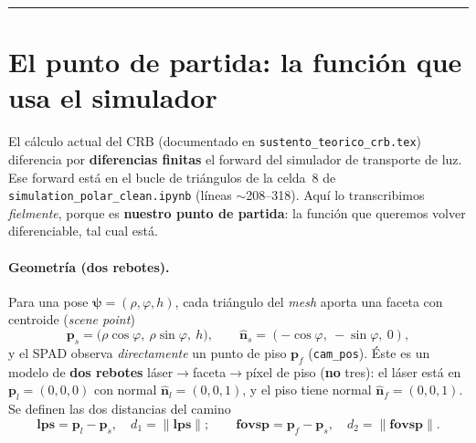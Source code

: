 \documentclass[11pt,a4paper]{article}
\theoremstyle{plain}
\theoremstyle{definition}
\newcommand{\vect}[1]{\boldsymbol{#1}}
\newcommand{\norm}[1]{\left\lVert #1 \right\rVert}
\begin{document}
\begin{abstract}
la superposici\'on anal\'itico-vs-FD a \emph{magnitud real} coincide dentro de
$\sim\!10\%$ en \textbf{ambos} ejes ($\sigma_\rho$ \emph{y} $\sigma_\varphi$),
gracias a densificar la faceta y a ligar los anchos de suavizado a la
discretizaci\'on ($\kappa=1/$p\'ixel, $\tau=\Delta t/\sqrt{12}$). Las derivadas se
obtienen \textbf{simb\'olicamente} con \texttt{sympy} (an\'alogo al Mathematica del
\emph{writeup}) y se validan contra diferencias finitas del mismo forward suave,
con error m\'aximo relativo $\sim\!5.5\times10^{-9}$. C\'odigo:
\texttt{crb\_analytic\_forward.py}; validaci\'on:
\texttt{validate\_analytic\_forward.py}. Importante: el CRB es funci\'on
\emph{solo del modelo} (no consume datos), y este forward anal\'itico es un
modelo \emph{aparte} --- no el simulador con sus salidas ``pasadas por funciones
suaves'' ---; la Sec.~\ref{sec:que-entra} aclara qu\'e entra al CRB y por qu\'e su
uso es leg\'itimo.
\end{abstract}

\tableofcontents
\bigskip\hrule\bigskip

\section{El punto de partida: la funci\'on que usa el simulador}
\label{sec:partida}

El c\'alculo actual del CRB (documentado en \texttt{sustento\_teorico\_crb.tex})
diferencia por \textbf{diferencias finitas} el forward del simulador de
transporte de luz. Ese forward est\'a en el bucle de tri\'angulos de la celda~8
de \texttt{simulation\_polar\_clean.ipynb} (l\'ineas $\sim$208--318). Aqu\'i lo
transcribimos \emph{fielmente}, porque es \textbf{nuestro punto de partida}: la
funci\'on que queremos volver diferenciable, tal cual est\'a.

\paragraph{Geometr\'ia (dos rebotes).}
Para una pose $\vect{\psi}=(\rho,\varphi,h)$, cada tri\'angulo del \emph{mesh}
aporta una faceta con centroide (\emph{scene point})
\begin{equation}
    \vect{p}_s=\bigl(\rho\cos\varphi,\ \rho\sin\varphi,\ h\bigr),
    \qquad
    \hat{\vect n}_s=(-\cos\varphi,\ -\sin\varphi,\ 0),
    \label{eq:pose}
\end{equation}
y el SPAD observa \emph{directamente} un punto de piso $\vect{p}_f$
(\texttt{cam\_pos}). \'Este es un modelo de \textbf{dos rebotes}
l\'aser$\to$faceta$\to$p\'ixel de piso (\textbf{no} tres): el l\'aser est\'a en
$\vect{p}_l=(0,0,0)$ con normal $\hat{\vect n}_l=(0,0,1)$, y el piso tiene normal
$\hat{\vect n}_f=(0,0,1)$. Se definen las dos distancias del camino
\begin{equation}
    \vect{lps}=\vect{p}_l-\vect{p}_s,\quad d_1=\norm{\vect{lps}};
    \qquad
    \vect{fovsp}=\vect{p}_f-\vect{p}_s,\quad d_2=\norm{\vect{fovsp}}.
    \label{eq:dist}
\end{equation}
\end{document}
